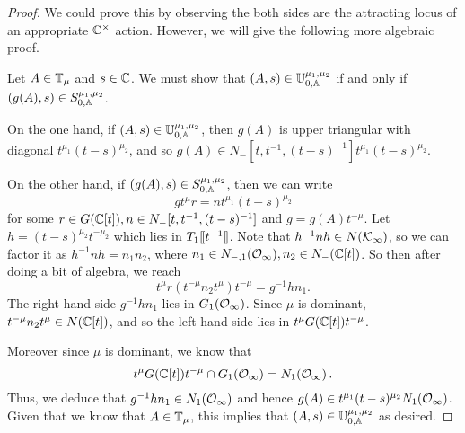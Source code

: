 \documentclass[draft]{article}
\begin{document}
\begin{proof}
We could prove this by observing the both sides are the attracting locus of an appropriate $ \CC^\times$ action. However, we will give the following more algebraic proof.


 Let $ A \in \TT_\mu$ and $ s \in \CC $. We must show that  $ (A,s) \in \UU^{\mu_1, \mu_2}_{0,\AA} $ if and only if $ (g(A),s) \in S^{\mu_1, \mu_2}_{0,\AA} $.
 
 On the one hand, if $ (A,s) \in \UU^{\mu_1, \mu_2}_{0,\AA} $, then $ g(A)$ is upper triangular with diagonal $ t^{\mu_1} (t-s)^{\mu_2}$, and so $ g(A) \in N_-[t, t^{-1}, (t-s)^{-1}] t^{\mu_1} (t-s)^{\mu_2}$.
 
 On the other hand, if $ (g(A), s) \in S^{\mu_1, \mu_2}_{0,\AA}$, then we can write 
 $$
 g t^\mu r= n t^{\mu_1} (t-s)^{\mu_2}
$$
for some $ r \in G(\CC[t]), n \in N_-[t, t^{-1}, (t-s)^{-1}] $ and $ g = g(A)t^{-\mu}$.  Let $ h = (t-s)^{\mu_2} t^{-\mu_2}$ which lies in $ T_1\xt[t^{-1}] $.
Note that $ h^{-1}n h \in N(\Kinf)$, 
so we can factor it as $ h^{-1} n h  = n_1 n_2 $, where $ n_1 \in N_{-,1}(\Oinf), n_2 \in N_-(\CC[t])$.  So then after doing a bit of algebra, we reach
$$
t^\mu r (t^{-\mu} n_2 t^\mu) t^{-\mu} = g^{-1} h n_1.
$$
The right hand side $ g^{-1} h n_1 $ lies in $ G_1(\Oinf) $.  Since $ \mu $ is dominant, $ t^{-\mu} n_2 t^\mu \in N(\CC[t])$, and so the left hand side lies in $t^\mu G(\CC[t]) t^{-\mu}$.

Moreover since $ \mu $ is dominant, we know that 
$$t^\mu G(\CC[t]) t^{-\mu} \cap G_1(\Oinf) = N_1(\Oinf)\,.$$
Thus, we deduce that $ g^{-1} h n_1 \in N_1(\Oinf)$ 
and hence $ g(A) \in t^{\mu_1} (t-s)^{\mu_2} N_1(\Oinf) $.  Given that we know that $ A \in \TT_\mu $, this implies that $ (A,s) \in \UU^{\mu_1, \mu_2}_{0,\AA}$ as desired.
\end{proof}

\end{document}
